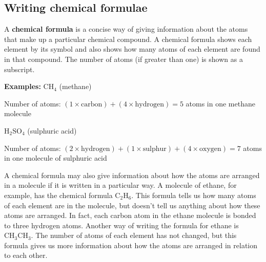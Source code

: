       

    
    \label{m38721*cid3}
            \subsection{ Writing chemical formulae}
            \nopagebreak
            
      
      \label{m38721*id62835}A \textbf{chemical formula} is a concise way of giving information about the atoms that make up a particular chemical compound. A chemical formula shows each element by its symbol and also shows how many atoms of each element are found in that compound. The number of atoms (if greater than one) is shown as a subscript.\par 
      \label{m38721*id62111}\noindent{}\textbf{Examples:}
        \textbf{\begin{math}{\mathrm{CH}}_{4}\end{math}} (methane)\par 
      \label{m38721*id63054}Number of atoms: \begin{math}\left(1\ensuremath{\times}\mathrm{carbon}\right)+\left(4\ensuremath{\times}\mathrm{hydrogen}\right)=5\end{math} atoms in one methane molecule\par 
      \label{m38721*id63058}\textbf{\begin{math}{\mathrm{H}}_{2}{\mathrm{SO}}_{4}\end{math}} (sulphuric acid)\par 
      \label{m38721*id63091}Number of atoms: \begin{math}\left(2\ensuremath{\times}\mathrm{hydrogen}\right)+\left(1\ensuremath{\times}\mathrm{sulphur}\right)+\left(4\ensuremath{\times}\mathrm{oxygen}\right)=7\end{math} atoms in one molecule of sulphuric acid\par 
      \label{m38721*id63095}A chemical formula may also give information about how the atoms are arranged in a molecule if it is written in a particular way. A molecule of ethane, for example, has the chemical formula \begin{math}{\mathrm{C}}_{2}{\mathrm{H}}_{6}\end{math}. This formula tells us how many atoms of each element are in the molecule, but doesn't tell us anything about how these atoms are arranged. In fact, each carbon atom in the ethane molecule is bonded to three hydrogen atoms. Another way of writing the formula for ethane is \begin{math}{\mathrm{CH}}_{3}{\mathrm{CH}}_{3}\end{math}. The number of atoms of each element has not changed, but this formula gives us more information about how the atoms are arranged in relation to each other.\par 
